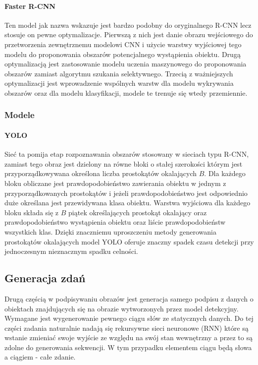 \paragraph{Faster R-CNN}
Ten model jak nazwa wskazuje jest bardzo podobny do oryginalnego R-CNN lecz stosuje on pewne optymalizacje. Pierwszą z nich jest danie obrazu wejściowego do przetworzenia zewnętrznemu modelowi CNN i użycie warstwy wyjściowej tego modelu do proponowania obszarów potencjalnego wystąpienia obiektu. Drugą optymalizacją jest zastosowanie modelu uczenia maszynowego do proponowania obszarów zamiast algorytmu szukania selektywnego.\cite{ORdum-1} Trzecią z ważniejszych optymalizacji jest wprowadzenie wspólnych warstw dla modelu wykrywania obszarów oraz dla modelu klasyfikacji, modele te trenuje się wtedy przemiennie. \cite{ORdum-3}

\subsubsection{Modele }
\paragraph{YOLO}
Sieć ta pomija etap rozpoznawania obszarów stosowany w sieciach typu R-CNN, zamiast tego obraz jest dzielony na równe bloki o stałej szerokości którym jest przyporządkowywana określona liczba prostokątów okalających $B$. Dla każdego bloku obliczane jest prawdopodobieństwo zawierania obiektu w jednym z przyporządkowanych prostokątów i jeżeli prawdopodobieństwo jest odpowiednio duże określana jest przewidywana klasa obiektu. Warstwa wyjściowa dla każdego bloku składa się  z $B$ piątek określających prostokąt okalający oraz prawdopodobieństwo wystąpienia obiektu oraz liście prawdopodobieństw wszystkich klas.\cite{ORdum-4} Dzięki znaczniemu uproszczeniu metody generowania prostokątów okalających model YOLO oferuje znaczny spadek czasu detekcji przy jednoczesnym nieznacznym spadku celności. \cite{YOLOnet} 
\subsection{Generacja zdań}
Drugą częścią w podpisywaniu obrazów jest generacja samego podpisu z danych o obiektach znajdujących się na obrazie wytworzonych przez model detekcyjny. Wymagane jest wygenerowanie pewnego ciągu słów ze statycznych danych. Do tej części zadania naturalnie nadają się rekursywne sieci neuronowe (RNN) które są wstanie zmieniać swoje wyjście ze względu na swój stan wewnętrzny a przez to są zdolne do generowania sekwencji.\cite{RNN-in-cg} W tym przypadku elementem ciągu będą słowa a ciągiem - całe zdanie.
